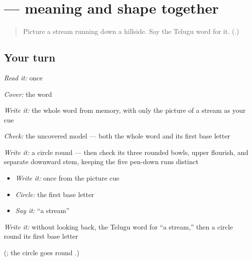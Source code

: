 \section[\texorpdfstring{\te{ఝరి} (jhari)}{ఝరి (jhari)}]{ — meaning and shape together}

\label{lesson:TE-R152-jhari-recall}



\begin{quote}
Picture a stream running down a hillside. Say the Telugu word for it. (\textbf{}.)
\end{quote}

\subsection*{Your turn}
\emph{Read it:} \textbf{} once

\emph{Cover:} the word

\emph{Write it:} the whole word from memory, with only the picture of a stream as your cue

\emph{Check:} the uncovered model — both the whole word and its first base letter

\emph{Write it:} a circle round \textbf{} — then check its three rounded bowls, upper flourish, and separate downward stem, keeping the five pen-down runs distinct

\begin{itemize}
\raggedright
  \item \emph{Write it:} \textbf{} once from the picture cue
  \item \emph{Circle:} the first base letter \textbf{}
  \item \emph{Say it:} “a stream”
\end{itemize}

\begin{tcolorbox}[breakable,colback=teal!4,colframe=teal!35!black,title={Before you move on}]
\emph{Write it:} without looking back, the Telugu word for “a stream,” then a circle round its first base letter

(\textbf{}; the circle goes round \textbf{}.)
\end{tcolorbox}
